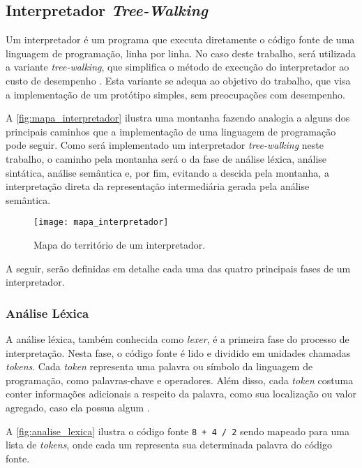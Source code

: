 \subsection{Interpretador \textit{Tree-Walking}}

Um interpretador é um programa que executa diretamente o código fonte de uma linguagem de programação, linha por linha. No caso deste trabalho, será utilizada a variante \textit{tree-walking}, que simplifica o método de execução do interpretador ao custo de desempenho \cite{craftinginterpreters}. Esta variante se adequa ao objetivo do trabalho, que visa a implementação de um protótipo simples, sem preocupações com desempenho.

A \autoref{fig:mapa_interpretador} ilustra uma montanha fazendo analogia a alguns dos principais caminhos que a implementação de uma linguagem de programação pode seguir. Como será implementado um interpretador \textit{tree-walking} neste trabalho, o caminho pela montanha será o da fase de análise léxica, análise sintática, análise semântica e, por fim, evitando a descida pela montanha, a interpretação direta da representação intermediária gerada pela análise semântica.

\begin{figure}[H]
	\centering
	\texttt{[image: mapa\_interpretador]}
	\caption{Mapa do território de um interpretador.}
	\label{fig:mapa_interpretador}
\end{figure}

A seguir, serão definidas em detalhe cada uma das quatro principais fases de um interpretador.

\subsubsection{Análise Léxica}

A análise léxica, também conhecida como \textit{lexer}, é a primeira fase do processo de interpretação. Nesta fase, o código fonte é lido e dividido em unidades chamadas \textit{tokens}. Cada \textit{token} representa uma palavra ou símbolo da linguagem de programação, como palavras-chave e operadores. Além disso, cada \textit{token} costuma conter informações adicionais a respeito da palavra, como sua localização ou valor agregado, caso ela possua algum \cite{craftinginterpreters}.

A \autoref{fig:analise_lexica} ilustra o código fonte \texttt{8 + 4 / 2} sendo mapeado para uma lista de \textit{tokens}, onde cada um representa sua determinada palavra do código fonte.

